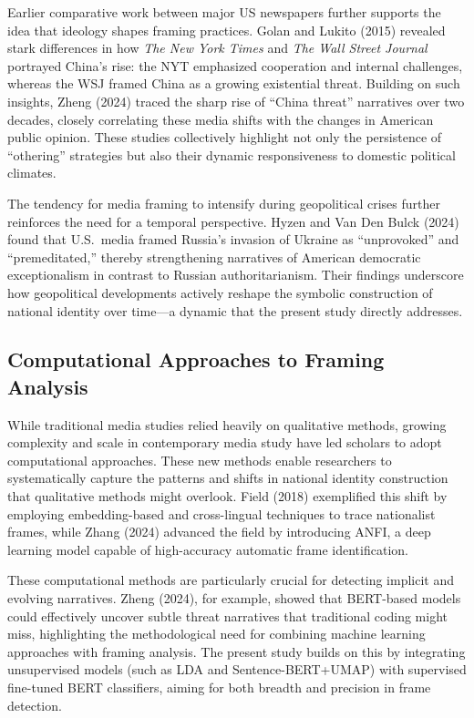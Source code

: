 \documentclass[12pt]{article}
\begin{document}
Earlier comparative work between major US newspapers further supports the idea that ideology shapes framing practices. Golan and Lukito (2015) revealed stark differences in how \textit{The New York Times} and \textit{The Wall Street Journal} portrayed China’s rise: the NYT emphasized cooperation and internal challenges, whereas the WSJ framed China as a growing existential threat. Building on such insights, Zheng (2024) traced the sharp rise of “China threat” narratives over two decades, closely correlating these media shifts with the changes in American public opinion. These studies collectively highlight not only the persistence of “othering” strategies but also their dynamic responsiveness to domestic political climates.

The tendency for media framing to intensify during geopolitical crises further reinforces the need for a temporal perspective. Hyzen and Van Den Bulck (2024) found that U.S.\ media framed Russia’s invasion of Ukraine as “unprovoked” and “premeditated,” thereby strengthening narratives of American democratic exceptionalism in contrast to Russian authoritarianism. Their findings underscore how geopolitical developments actively reshape the symbolic construction of national identity over time—a dynamic that the present study directly addresses.

\subsection*{Computational Approaches to Framing Analysis}

While traditional media studies relied heavily on qualitative methods, growing complexity and scale in contemporary media study have led scholars to adopt computational approaches. These new methods enable researchers to systematically capture the patterns and shifts in national identity construction that qualitative methods might overlook. Field (2018) exemplified this shift by employing embedding-based and cross-lingual techniques to trace nationalist frames, while Zhang (2024) advanced the field by introducing ANFI, a deep learning model capable of high-accuracy automatic frame identification.

These computational methods are particularly crucial for detecting implicit and evolving narratives. Zheng (2024), for example, showed that BERT-based models could effectively uncover subtle threat narratives that traditional coding might miss, highlighting the methodological need for combining machine learning approaches with framing analysis. The present study builds on this by integrating unsupervised models (such as LDA and Sentence-BERT+UMAP) with supervised fine-tuned BERT classifiers, aiming for both breadth and precision in frame detection.
\end{document}
